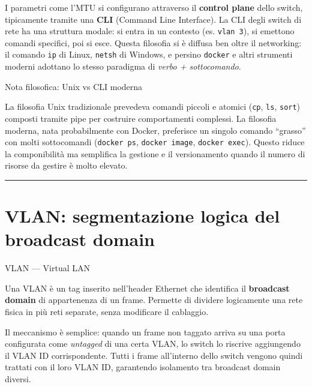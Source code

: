 \documentclass[
  italian,
  openany]{book}
\begin{document}
I parametri come l'MTU si configurano attraverso il \textbf{control
plane} dello switch, tipicamente tramite una \textbf{CLI} (Command Line
Interface). La CLI degli switch di rete ha una struttura modale: si
entra in un contesto (es. \texttt{vlan\ 3}), si emettono comandi
specifici, poi si esce. Questa filosofia si è diffusa ben oltre il
networking: il comando \texttt{ip} di Linux, \texttt{netsh} di Windows,
e persino \texttt{docker} e altri strumenti moderni adottano lo stesso
paradigma di \emph{verbo + sottocomando}.

\begin{calloutnote}{Nota filosofica: Unix vs CLI moderna}

La filosofia Unix tradizionale prevedeva comandi piccoli e atomici
(\texttt{cp}, \texttt{ls}, \texttt{sort}) composti tramite pipe per
costruire comportamenti complessi. La filosofia moderna, nata
probabilmente con Docker, preferisce un singolo comando ``grasso'' con
molti sottocomandi (\texttt{docker\ ps}, \texttt{docker\ image},
\texttt{docker\ exec}). Questo riduce la componibilità ma semplifica la
gestione e il versionamento quando il numero di risorse da gestire è
molto elevato.

\end{calloutnote}

\begin{center}\rule{0.5\linewidth}{0.5pt}\end{center}

\section{VLAN: segmentazione logica del broadcast
domain}\label{vlan-segmentazione-logica-del-broadcast-domain}

\begin{calloutdefinition}{VLAN — Virtual LAN}

Una VLAN è un tag inserito nell'header Ethernet che identifica il
\textbf{broadcast domain} di appartenenza di un frame. Permette di
dividere logicamente una rete fisica in più reti separate, senza
modificare il cablaggio.

\end{calloutdefinition}

Il meccanismo è semplice: quando un frame non taggato arriva su una
porta configurata come \emph{untagged} di una certa VLAN, lo switch lo
riscrive aggiungendo il VLAN ID corrispondente. Tutti i frame
all'interno dello switch vengono quindi trattati con il loro VLAN ID,
garantendo isolamento tra broadcast domain diversi.
\end{document}

